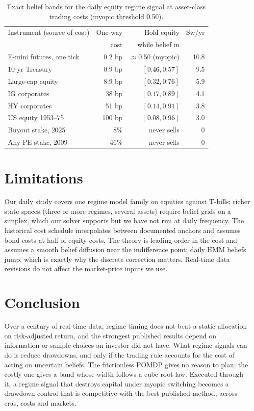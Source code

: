 \documentclass[sigconf,nonacm]{acmart}
\begin{document}
\begin{table}[t]
\caption{Exact belief bands for the daily equity regime signal at asset-class trading costs (myopic threshold 0.50).}\label{tab:alloc}
\small
\begin{tabular}{lrrr}
\toprule
Instrument (source of cost) & One-way & Hold equity & Sw/yr\\
 & cost & while belief in & \\
\midrule
E-mini futures, one tick \cite{fett2017liquidity} & 0.2 bp & $\approx$0.50 (myopic) & 10.8\\
10-yr Treasury \cite{adrian2023evolution} & 0.9 bp & $[0.46, 0.57]$ & 9.5\\
Large-cap equity \cite{frazzini2018trading} & 8.9 bp & $[0.32, 0.76]$ & 5.9\\
IG corporates \cite{bessembinder2018capital,bessembinder2020survey} & 38 bp & $[0.17, 0.89]$ & 4.1\\
HY corporates \cite{bessembinder2018capital} & 51 bp & $[0.14, 0.91]$ & 3.8\\
US equity 1953--75 \cite{jones2002century} & 100 bp & $[0.08, 0.96]$ & 3.0\\
Buyout stake, 2025 \cite{jefferies2026secondary} & 8\% & never sells & 0\\
Any PE stake, 2009 \cite{nadauld2019liquidity} & 46\% & never sells & 0\\
\bottomrule
\end{tabular}
\end{table}

\section{Limitations}
Our daily study covers one regime model family on equities against T-bills; richer state spaces (three or more regimes, several assets) require belief grids on a simplex, which our solver supports but we have not run at daily frequency. The historical cost schedule interpolates between documented anchors and assumes bond costs at half of equity costs. The theory is leading-order in the cost and assumes a smooth belief diffusion near the indifference point; daily HMM beliefs jump, which is exactly why the discrete correction matters. Real-time data revisions do not affect the market-price inputs we use.

\section{Conclusion}
Over a century of real-time data, regime timing does not beat a static allocation on risk-adjusted return, and the strongest published results depend on information or sample choices an investor did not have. What regime signals can do is reduce drawdowns, and only if the trading rule accounts for the cost of acting on uncertain beliefs. The frictionless POMDP gives no reason to plan; the costly one gives a band whose width follows a cube-root law. Executed through it, a regime signal that destroys capital under myopic switching becomes a drawdown control that is competitive with the best published method, across eras, costs and markets.



\end{document}
